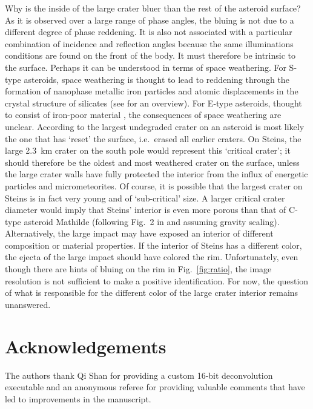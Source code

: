 \documentclass[preprint,3p,authoryear]{elsarticle}
\begin{document}
Why is the inside of the large crater bluer than the rest of the asteroid surface? As it is observed over a large range of phase angles, the bluing is not due to a different degree of phase reddening. It is also not associated with a particular combination of incidence and reflection angles because the same illuminations conditions are found on the front of the body. It must therefore be intrinsic to the surface. Perhaps it can be understood in terms of space weathering. For S-type asteroids, space weathering is thought to lead to reddening through the formation of nanophase metallic iron particles and atomic displacements in the crystal structure of silicates (see \citealt{L06} for an overview). For E-type asteroids, thought to consist of iron-poor material \citep{FL01,C04}, the consequences of space weathering are unclear. According to \citet{A08} the largest undegraded crater on an asteroid is most likely the one that has `reset' the surface, i.e.\ erased all earlier craters. On Steins, the large 2.3~km crater on the south pole would represent this `critical crater'; it should therefore be the oldest and most weathered crater on the surface, unless the large crater walls have fully protected the interior from the influx of energetic particles and micrometeorites. Of course, it is possible that the largest crater on Steins is in fact very young and of `sub-critical' size. A larger critical crater diameter would imply that Steins' interior is even more porous than that of C-type asteroid Mathilde (following Fig.~2 in \citealt{A08} and assuming gravity scaling). Alternatively, the large impact may have exposed an interior of different composition or material properties. If the interior of Steins has a different color, the ejecta of the large impact should have colored the rim. Unfortunately, even though there are hints of bluing on the rim in Fig.~\ref{fig:ratio}, the image resolution is not sufficient to make a positive identification. For now, the question of what is responsible for the different color of the large crater interior remains unanswered.


\section*{Acknowledgements}

The authors thank Qi Shan for providing a custom 16-bit deconvolution executable and an anonymous referee for providing valuable comments that have led to improvements in the manuscript.

\end{document}
